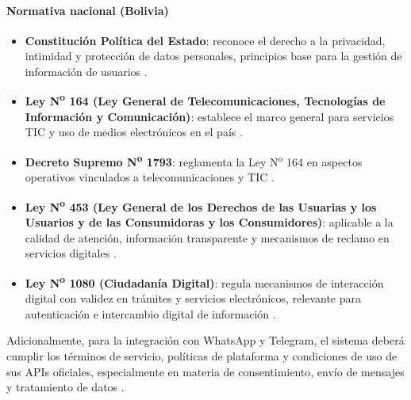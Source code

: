 \paragraph{Normativa nacional (Bolivia)}
\begin{itemize}
    \item \textbf{Constitución Política del Estado}: reconoce el derecho a la privacidad, intimidad y protección de datos personales, principios base para la gestión de información de usuarios \parencite{cpe2009}.
    \item \textbf{Ley N\textsuperscript{o} 164 (Ley General de Telecomunicaciones, Tecnologías de Información y Comunicación)}: establece el marco general para servicios TIC y uso de medios electrónicos en el país \parencite{ley164}.
    \item \textbf{Decreto Supremo N\textsuperscript{o} 1793}: reglamenta la Ley N\textsuperscript{o} 164 en aspectos operativos vinculados a telecomunicaciones y TIC \parencite{ds1793}.
    \item \textbf{Ley N\textsuperscript{o} 453 (Ley General de los Derechos de las Usuarias y los Usuarios y de las Consumidoras y los Consumidores)}: aplicable a la calidad de atención, información transparente y mecanismos de reclamo en servicios digitales \parencite{ley453}.
    \item \textbf{Ley N\textsuperscript{o} 1080 (Ciudadanía Digital)}: regula mecanismos de interacción digital con validez en trámites y servicios electrónicos, relevante para autenticación e intercambio digital de información \parencite{ley1080}.
\end{itemize}

Adicionalmente, para la integración con WhatsApp y Telegram, el sistema deberá cumplir los términos de servicio, políticas de plataforma y condiciones de uso de sus APIs oficiales, especialmente en materia de consentimiento, envío de mensajes y tratamiento de datos \parencite{whatsapp_business_terms,telegram_terms}.
